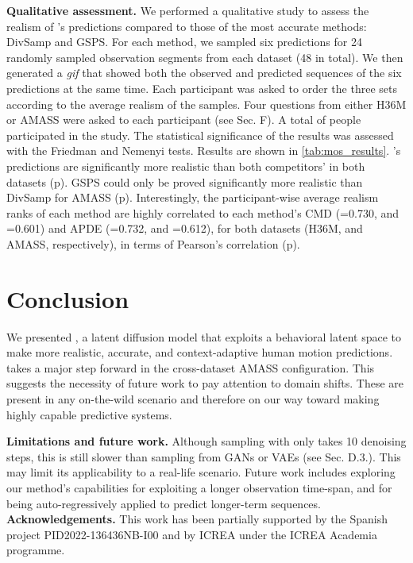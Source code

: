\documentclass[10pt,twocolumn,letterpaper]{article}
\begin{document}
\textbf{Qualitative assessment.} We performed a qualitative study to assess the realism of \modelname{}'s predictions compared to those of the most accurate methods: DivSamp and GSPS. For each method, we sampled six predictions for 24 randomly sampled observation segments from each dataset (48 in total). We then generated a \textit{gif} that showed both the observed and predicted sequences of the six predictions at the same time. Each participant was asked to order the three sets according to the average realism of the samples. Four questions from either H36M or AMASS were asked to each participant (see \supp{} Sec. F). 
A total of \participants{} people participated in the study. The statistical significance of the results was assessed with the Friedman and Nemenyi tests. Results are shown in \autoref{tab:mos_results}. \modelname{}'s predictions are significantly more realistic than both competitors' in both datasets (p). GSPS could only be proved significantly more realistic than DivSamp for AMASS (p). Interestingly, the participant-wise average realism ranks of each method are highly correlated to each method's CMD (=0.730, and =0.601) and APDE (=0.732, and =0.612), for both datasets (H36M, and AMASS, respectively), in terms of Pearson's correlation (p).
 \vspace{-0.3cm}
\section{Conclusion}
\label{sec:conclusions}
\vspace{-0.2cm}
We presented \modelname{}, a latent diffusion model that exploits a behavioral latent space to make more realistic, accurate, and context-adaptive human motion predictions. \modelname{} takes a major step forward in the cross-dataset AMASS configuration. This suggests the necessity of future work to pay attention to domain shifts. These are present in any on-the-wild scenario and therefore on our way toward making highly capable predictive systems.

\textbf{Limitations and future work.} Although sampling with \modelname{} only takes 10 denoising steps, this is still slower than sampling from GANs or VAEs (see \supp{} Sec. D.3.). This may limit its applicability to a real-life scenario. Future work includes exploring our method's capabilities for exploiting a longer observation time-span, and for being auto-regressively applied to predict longer-term sequences. 
\textbf{Acknowledgements. }
This work has been partially supported by the Spanish project PID2022-136436NB-I00 and by ICREA under the ICREA Academia programme.
\end{document}
